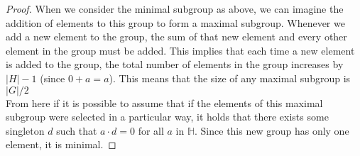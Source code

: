 \documentclass{exam} %
\newcommand{\m}[1]{\mathbb{#1}}    %
\theoremstyle{plain}
\theoremstyle{definition}
\theoremstyle{remark}
\numberwithin{equation}{section}  %
\begin{document}
\begin{questions}
\begin{solution}
\begin{proof}
    When we consider the minimal subgroup as above, we can imagine the addition
    of elements to this group to form a maximal subgroup. Whenever we add a new
    element to the group, the sum of that new element and every other element in
    the group must be added. This implies that each time a new element is added
    to the group, the total number of elements in the group increases by $|H| 
    - 1$ (since $0+a = a$). This means that the size of any maximal subgroup
    is $|G|/2$\\

    From here if it is possible to assume that if the elements of this maximal 
    subgroup were selected in a particular way, it holds that there exists some
    singleton $d$ such that $a\cdot d = 0$ for all $a$ in $\m{H}$. Since this
    new group has only one element, it is minimal.
  \end{proof}
\end{solution}
\end{questions} 
\end{document}
